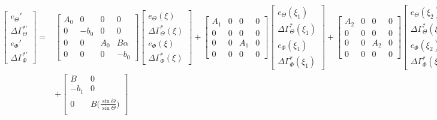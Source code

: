 \documentclass[main.tex]{subfiles}
\begin{document}
	 \begin{align}
	 \begin{bmatrix}
	 e_\Theta' \\
	 \Delta \Gamma_\Theta^{*'} \\
	 e_\Phi' \\
	 \Delta \Gamma_\Phi^{*'}
	 \end{bmatrix} =&
	 \begin{bmatrix}
	 A_0 & 0 & 0 & 0\\
	 0 & -b_0 & 0 & 0 \\
	 0 & 0 & A_0 & B \alpha \\
	 0 & 0 & 0 & -b_0
	 \end{bmatrix}
	 \begin{bmatrix}
	 e_\Theta(\xi) \\
	 \Delta \Gamma_\Theta^{*} (\xi) \\
	 e_\Phi(\xi) \\
	 \Delta \Gamma_\Phi^{*} (\xi) 
	 \end{bmatrix} + 
	 \begin{bmatrix}
	 A_1 & 0 & 0 & 0\\
	 0 & 0 & 0 & 0 \\
	 0 & 0 & A_1 & 0 \\
	 0 & 0 & 0 & 0 
	 \end{bmatrix}
	 \begin{bmatrix}
	 e_\Theta(\xi_1) \\
	 \Delta \Gamma_\Theta^{*} (\xi_1) \\
	 e_\Phi(\xi_1) \\
	 \Delta \Gamma_\Phi^{*} (\xi_1) 
	 \end{bmatrix} +
	 \begin{bmatrix}
	 A_2 & 0 & 0 & 0\\
	 0 & 0 & 0 & 0 \\
	 0 & 0 & A_2 & 0 \\
	 0 & 0 & 0 & 0 
	 \end{bmatrix}
	 \begin{bmatrix}
	 e_\Theta(\xi_2) \\
	 \Delta \Gamma_\Theta^{*} (\xi_2) \\
	 e_\Phi(\xi_2) \\
	 \Delta \Gamma_\Phi^{*} (\xi_2) 
	 \end{bmatrix} \nonumber\\
	 &+ \begin{bmatrix}
	 B & 0 \\
	 -b_1 & 0 \\
	 0 & B\bigg( \frac{\sin \check{\Theta}}{\sin \Theta}\bigg) \\

\end{bmatrix}
\end{align}
\end{document}
